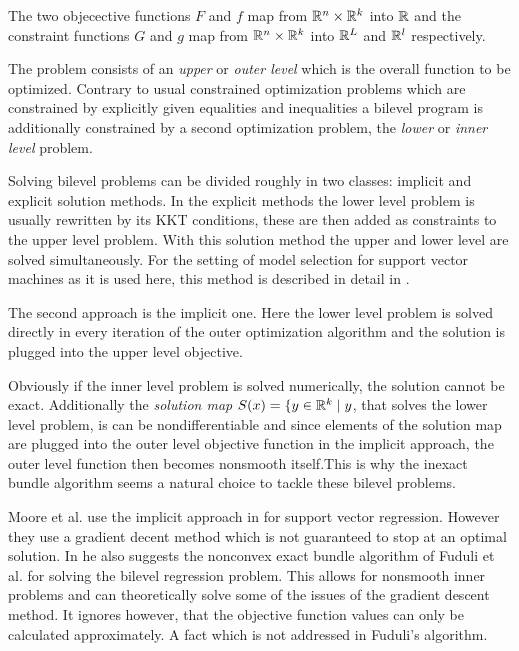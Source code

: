 The two objecective functions \(F\) and \(f\) map from \(\mathbb{R}^n\times\mathbb{R}^k\) into \(\mathbb{R}\) and the constraint functions \(G\) and \(g\) map from \(\mathbb{R}^n\times\mathbb{R}^k\) into \(\mathbb{R}^L\) and \(\mathbb{R}^l\) respectively. 

The problem consists of an \emph{upper} or \emph{outer level} which is the overall function to be optimized. Contrary to usual constrained optimization problems which are constrained by explicitly given equalities and inequalities a  bilevel program is additionally constrained by a second optimization problem, the \emph{lower} or \emph{inner level} problem.

Solving bilevel problems can be divided roughly in two classes: implicit and explicit solution methods. 
In the explicit methods the lower level problem is usually rewritten by its KKT conditions, these are then added as constraints to the upper level problem. With this solution method the upper and lower level are solved simultaneously. For the setting of model selection for support vector machines as it is used here, this method is described in detail in \cite{Kunapuli2008}.

The second approach is the implicit one. Here the lower level problem is solved directly in every iteration of the outer optimization algorithm and the solution is plugged into the upper level objective. 

Obviously if the inner level problem is solved numerically, the solution cannot be exact. Additionally the \emph{solution map} \( S(x) = \{y \in \mathbb{R}^k \mid y\), that solves the lower level problem, is can be nondifferentiable \cite{Outrata1998} and since elements of  the solution map are plugged into the outer level objective function in the implicit approach, the outer level function then becomes nonsmooth itself.This is why the inexact bundle algorithm seems a natural choice to tackle these bilevel problems. 

Moore et al. use the implicit approach in \cite{Moore2011} for support vector regression. However they use a gradient decent method which is not guaranteed to stop at an optimal solution.
In \cite{Moore2010a} he also suggests the nonconvex exact bundle algorithm of Fuduli et al. \cite{Fuduli2004a} for solving the bilevel regression problem. This allows for nonsmooth inner problems and can theoretically solve some of the issues of the gradient descent method. It ignores however, that the objective function values can only be calculated approximately. A fact which is not addressed in Fuduli's algorithm.

